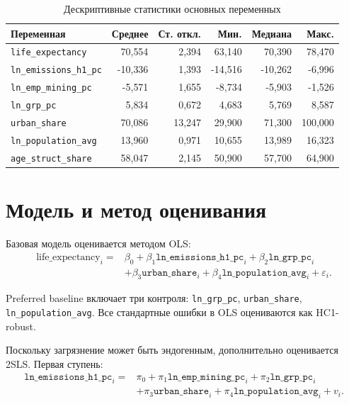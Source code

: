 \documentclass[11pt,a4paper]{article}
\begin{document}
\begin{table}[H]
\centering
\caption{Дескриптивные статистики основных переменных}
\label{tab:desc}
\begin{tabular}{lrrrrr}
\toprule
\textbf{Переменная} & \textbf{Среднее} & \textbf{Ст. откл.} & \textbf{Мин.} & \textbf{Медиана} & \textbf{Макс.} \\
\midrule
\texttt{life\_expectancy}       & 70{,}554 & 2{,}394 & 63{,}140 & 70{,}390 & 78{,}470 \\
\texttt{ln\_emissions\_h1\_pc}  & -10{,}336 & 1{,}393 & -14{,}516 & -10{,}262 & -6{,}996 \\
\texttt{ln\_emp\_mining\_pc}    & -5{,}571 & 1{,}655 & -8{,}734 & -5{,}903 & -1{,}526 \\
\texttt{ln\_grp\_pc}            & 5{,}834 & 0{,}672 & 4{,}683 & 5{,}769 & 8{,}587 \\
\texttt{urban\_share}           & 70{,}086 & 13{,}247 & 29{,}900 & 71{,}300 & 100{,}000 \\
\texttt{ln\_population\_avg}    & 13{,}960 & 0{,}971 & 10{,}655 & 13{,}989 & 16{,}323 \\
\texttt{age\_struct\_share}     & 58{,}047 & 2{,}145 & 50{,}900 & 57{,}700 & 64{,}900 \\
\bottomrule
\end{tabular}
\end{table}

\section{Модель и метод оценивания}

Базовая модель оценивается методом OLS:
\begin{equation}
\label{eq:ols}
\begin{aligned}
\text{life\_expectancy}_i ={}& \beta_0+\beta_1\texttt{ln\_emissions\_h1\_pc}_i+\beta_2\texttt{ln\_grp\_pc}_i\\
&+\beta_3\texttt{urban\_share}_i+\beta_4\texttt{ln\_population\_avg}_i+\varepsilon_i .
\end{aligned}
\end{equation}

Preferred baseline включает три контроля: \texttt{ln\_grp\_pc}, \texttt{urban\_share}, \texttt{ln\_population\_avg}. Все стандартные ошибки в OLS оцениваются как HC1-robust.

Поскольку загрязнение может быть эндогенным, дополнительно оценивается 2SLS. Первая ступень:
\begin{equation}
\label{eq:first}
\begin{aligned}
\texttt{ln\_emissions\_h1\_pc}_i ={}& \pi_0+\pi_1\texttt{ln\_emp\_mining\_pc}_i+\pi_2\texttt{ln\_grp\_pc}_i\\
&+\pi_3\texttt{urban\_share}_i+\pi_4\texttt{ln\_population\_avg}_i+v_i .
\end{aligned}
\end{equation}
\end{document}
